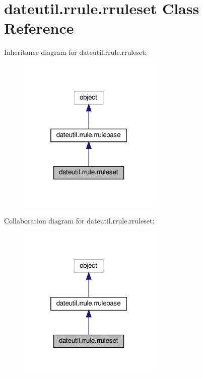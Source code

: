 \hypertarget{classdateutil_1_1rrule_1_1rruleset}{}\section{dateutil.\+rrule.\+rruleset Class Reference}
\label{classdateutil_1_1rrule_1_1rruleset}


Inheritance diagram for dateutil.\+rrule.\+rruleset\+:
\nopagebreak
\begin{figure}[H]
\begin{center}
\leavevmode
\includegraphics[width=193pt]{classdateutil_1_1rrule_1_1rruleset__inherit__graph}
\end{center}
\end{figure}


Collaboration diagram for dateutil.\+rrule.\+rruleset\+:
\nopagebreak
\begin{figure}[H]
\begin{center}
\leavevmode
\includegraphics[width=193pt]{classdateutil_1_1rrule_1_1rruleset__coll__graph}
\end{center}
\end{figure}
